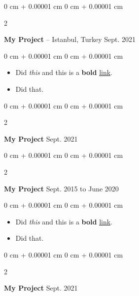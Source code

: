\documentclass[10pt, letterpaper]{article}
\newenvironment{highlights}{
    \begin{itemize}[
        topsep=0.10 cm,
        parsep=0.10 cm,
        partopsep=0pt,
        itemsep=0pt,
        leftmargin=0 cm + 10pt
    ]
}{
    \end{itemize}
} %
\newenvironment{onecolentry}{
    \begin{adjustwidth}{
        0 cm + 0.00001 cm
    }{
        0 cm + 0.00001 cm
    }
}{
    \end{adjustwidth}
} %
\newenvironment{twocolentry}[2][]{
    \onecolentry
    \def\secondColumn{#2}
    \setcolumnwidth{\fill, 4.5 cm}
    \begin{paracol}{2}
}{
    \switchcolumn \raggedleft \secondColumn
    \end{paracol}
    \endonecolentry
} %
\begin{document}
        \vspace{0.2 cm}

        \begin{twocolentry}{
            Sept. 2021
        }
            \textbf{My Project} -- Istanbul, Turkey\end{twocolentry}

        \vspace{0.10 cm}
        \begin{onecolentry}
            \begin{highlights}
                \item Did \textit{this} and this is a \textbf{bold} \href{https://example.com}{link}.
                \item Did that.
            \end{highlights}
        \end{onecolentry}


        \vspace{0.2 cm}

        \begin{twocolentry}{
            Sept. 2021
        }
            \textbf{My Project}\end{twocolentry}



        \vspace{0.2 cm}

        \begin{twocolentry}{
            Sept. 2015 to June 2020
        }
            \textbf{My Project}\end{twocolentry}

        \vspace{0.10 cm}
        \begin{onecolentry}
            \begin{highlights}
                \item Did \textit{this} and this is a \textbf{bold} \href{https://example.com}{link}.
                \item Did that.
            \end{highlights}
        \end{onecolentry}


        \vspace{0.2 cm}

        \begin{twocolentry}{
            Sept. 2021
        }
            \textbf{My Project}\end{twocolentry}
\end{document}
